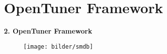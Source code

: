 %     
    
  \section{OpenTuner Framework}
  
  



  
  \begingroup
  \begin{frame}
  
  \textbf{2. OpenTuner Framework}
    
  
  \begin{figure}[ht]
    \centering	      
    \texttt{[image: bilder/smdb]}
    \label{smdb}
  \end{figure}

  \end{frame}
  \endgroup
    
